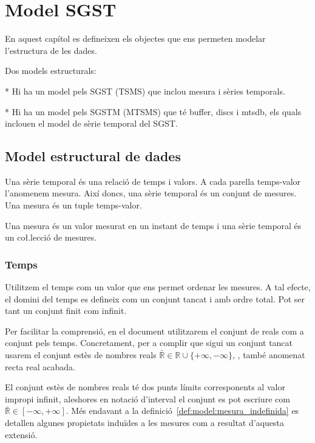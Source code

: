 
\chapter{Model SGST}

En aquest capítol es defineixen els objectes que ens permeten modelar l'estructura de les dades.

Dos models estructurals:

* Hi ha un model pels SGST (TSMS) que inclou mesura i sèries temporals.

* Hi ha un model pels SGSTM (MTSMS) que té buffer, discs i mtsdb, els quals inclouen el model de sèrie temporal del SGST.




\section{Model estructural de dades}

Una sèrie temporal és una relació de temps i valors. A cada parella
temps-valor l'anomenem mesura. Així doncs, una sèrie temporal és un
conjunt de mesures. Una mesura és un tuple temps-valor.



Una mesura és un valor mesurat en un instant de temps i una sèrie
temporal és un co\l.lecció de mesures.





\subsection{Temps}
\label{sec:sgst:temps}

Utilitzem el temps com un valor que ens permet ordenar les mesures.  A
tal efecte, el domini del temps es defineix com un conjunt
tancat %
i amb ordre total. Pot ser tant un conjunt finit com infinit. 

Per facilitar la comprensió, en el document utilitzarem el conjunt de
reals com a conjunt pels temps. Concretament, per a complir que sigui
un conjunt tancat usarem el conjunt estès de nombres reals
$\bar{\mathbb{R}} \in \mathbb{R} \cup
\{+\infty,-\infty\}$, \parencite{wiki:extendedreal,cantrell:extendedreal},
també anomenat recta real acabada.


El conjunt estès de nombres reals té dos punts límits corresponents al
valor impropi infinit, aleshores en notació d'interval el conjunt es
pot escriure com $\bar{\mathbb{R}} \in [-\infty,+\infty]$.  Més
endavant a la definició~\ref{def:model:mesura_indefinida} es detallen
algunes propietats induïdes a les mesures com a resultat d'aquesta
extensió.


